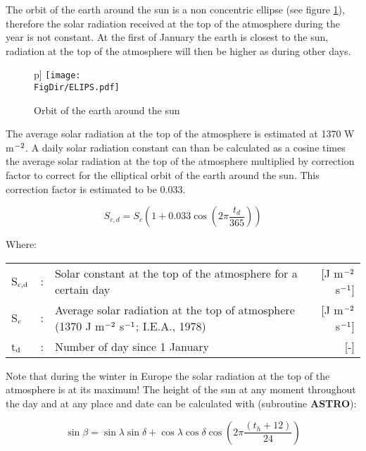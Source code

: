 The orbit of the earth around the sun is a
non concentric ellipse (see figure \ref{fig:orbit}), therefore the solar radiation received 
at the top of the atmosphere during the year is not constant. At the first of January the 
earth is closest to the sun, radiation at the top of the atmosphere will then be higher as 
during other days.

\begin{figure}p]
	\centering
	\texttt{[image: \\FigDir/ELIPS.pdf]}
	\caption{Orbit of the earth around the sun}
	\label{fig:orbit}
\end{figure}

The average solar radiation at the top of the atmosphere is estimated at 1370 W m$^{\rm -2}$. A daily solar radiation constant can than be calculated as a cosine times the average solar radiation at the top of the atmosphere multiplied by correction factor to correct for the elliptical orbit of the earth around the sun. This correction factor is estimated to be 0.033.

\begin{equation}
\label{eq:SolarConst}
S _{c,d} = S _{c} (1+0.033 \cos (2 \pi {\frac{t _{d} }{365}} ))
\end{equation}

Where:\\[5pt]
\begin{tabularx}{\textwidth}{llXr}
	S$_{{\rm c,d}}$ &:& Solar constant at the top of the atmosphere for a certain day  & [J m$^{{\rm -2}}$ s$^{{\rm -1}}$]\\
	S$_{{\rm c}}$ &:& Average solar radiation at the top of atmosphere (1370 J m$^{{\rm -2}}$ s$^{{\rm -1}}$; I.E.A., 1978) & [J m$^{{\rm -2}}$ s$^{{\rm -1}}$]\\
	t$_{{\rm d}}$ &:& Number of day since 1 January  & [-]\\
\end{tabularx}

Note that during the winter in Europe the solar radiation at the top of the atmo\-sphere is at 
its maximum! The height of the sun at any moment throughout the day and at any place and date can be
calculated with (subroutine {\bf ASTRO}):

\begin{equation}
\label{eq:SolarElevation}
\sin \beta = \sin \lambda \sin \delta + \cos \lambda \cos \delta \cos (2 \pi {\frac{(t _{h} +12)}{24}} )
\end{equation}

